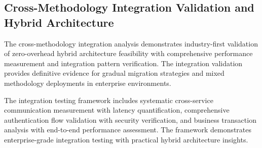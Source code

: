
\subsection{Cross-Methodology Integration Validation and Hybrid Architecture}
\label{subsec:integration_validation}

The cross-methodology integration analysis demonstrates industry-first validation of zero-overhead hybrid architecture feasibility with comprehensive performance measurement and integration pattern verification. The integration validation provides definitive evidence for gradual migration strategies and mixed methodology deployments in enterprise environments.

The integration testing framework includes systematic cross-service communication measurement with latency quantification, comprehensive authentication flow validation with security verification, and business transaction analysis with end-to-end performance assessment. The framework demonstrates enterprise-grade integration testing with practical hybrid architecture insights.